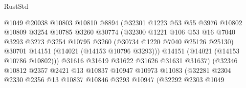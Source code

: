 \begin{lexlean}{RustStd}
\begin{coremodule}
                                  @1049
                                  @20038
                                  @10803
                                  @10810
                                  @8894
                                  (@32301
                                    @1223
                                    @53
                                    @55
                                    @3976
                                    @10802
                                    @10809
                                    @3254
                                    @10785
                                    @3260
                                    @30774
                                    (@32300
                                      @1221
                                      @106
                                      @53
                                      @16
                                      @7040
                                      @3293
                                      @3273
                                      @3254
                                      @10795
                                      @3260
                                      (@30734 @1220 @7040 @25126 @25130)
                                      @30701
                                      @14151
                                      (@14021 (@14153 @10796 @3293)))
                                    @14151
                                    (@14021 (@14153 @10786 @10802)))
                                  @31616
                                  @31619
                                  @31622
                                  @31626
                                  @31631
                                  @31637)
                                (@32346
                                  @10812
                                  @2357
                                  @2421
                                  @13
                                  @10837
                                  @10947
                                  @10973
                                  @11083
                                  (@32281
                                    @2304
                                    @2330
                                    @2356
                                    @13
                                    @10837
                                    @10846
                                    @3293
                                    @10947
                                    (@32292
                                      @2303
                                      @1049

\end{coremodule}
\end{lexlean}
